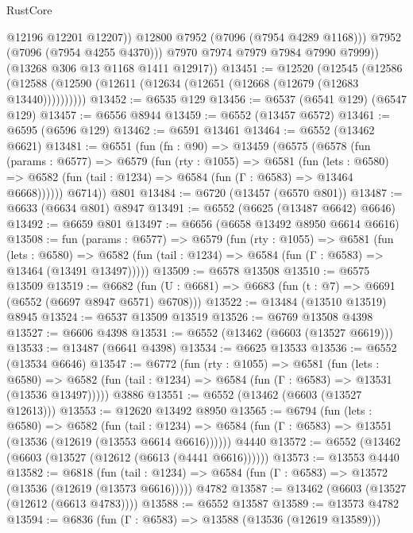 \begin{lexlean}{RustCore}
\begin{coremodule}
                  @12196
                  @12201
                  @12207))
              @12800
              @7952
              (@7096 (@7954 @4289 @1168)))
            @7952
            (@7096 (@7954 @4255 @4370)))
          @7970
          @7974
          @7979
          @7984
          @7990
          @7999))
      (@13268 @306 @13 @1168 @1411 @12917))
@13451 := @12520
    (@12545 (@12586 (@12588 (@12590 (@12611 (@12634 (@12651 (@12668 (@12679 (@12683 @13440))))))))))
@13452 := @6535 @129
@13456 := @6537 (@6541 @129) (@6547 @129)
@13457 := @6556 @8944
@13459 := @6552 (@13457 @6572)
@13461 := @6595 (@6596 @129)
@13462 := @6591 @13461
@13464 := @6552 (@13462 @6621)
@13481 := @6551
    (fun (fn : @90) =>
    @13459
      (@6575
        (@6578
          (fun (params : @6577) =>
          @6579
            (fun (rty : @1055) =>
            @6581
              (fun (lets : @6580) =>
              @6582 (fun (tail : @1234) => @6584 (fun (Γ : @6583) => @13464 @6668))))))
        @6714))
    @801
@13484 := @6720 (@13457 (@6570 @801))
@13487 := @6633 (@6634 @801) @8947
@13491 := @6552 (@6625 (@13487 @6642) @6646)
@13492 := @6659 @801
@13497 := @6656 (@6658 @13492 @8950 @6614 @6616)
@13508 := fun (params : @6577) =>
  @6579
    (fun (rty : @1055) =>
    @6581
      (fun (lets : @6580) =>
      @6582 (fun (tail : @1234) => @6584 (fun (Γ : @6583) => @13464 (@13491 @13497)))))
@13509 := @6578 @13508
@13510 := @6575 @13509
@13519 := @6682 (fun (U : @6681) => @6683 (fun (t : @7) => @6691 (@6552 (@6697 @8947 @6571) @6708)))
@13522 := @13484 (@13510 @13519) @8945
@13524 := @6537 @13509 @13519
@13526 := @6769 @13508 @4398
@13527 := @6606 @4398
@13531 := @6552 (@13462 (@6603 (@13527 @6619)))
@13533 := @13487 (@6641 @4398)
@13534 := @6625 @13533
@13536 := @6552 (@13534 @6646)
@13547 := @6772
    (fun (rty : @1055) =>
    @6581
      (fun (lets : @6580) =>
      @6582 (fun (tail : @1234) => @6584 (fun (Γ : @6583) => @13531 (@13536 @13497)))))
    @3886
@13551 := @6552 (@13462 (@6603 (@13527 @12613)))
@13553 := @12620 @13492 @8950
@13565 := @6794
    (fun (lets : @6580) =>
    @6582
      (fun (tail : @1234) =>
      @6584 (fun (Γ : @6583) => @13551 (@13536 (@12619 (@13553 @6614 @6616))))))
    @4440
@13572 := @6552 (@13462 (@6603 (@13527 (@12612 (@6613 (@4441 @6616))))))
@13573 := @13553 @4440
@13582 := @6818
    (fun (tail : @1234) => @6584 (fun (Γ : @6583) => @13572 (@13536 (@12619 (@13573 @6616)))))
    @4782
@13587 := @13462 (@6603 (@13527 (@12612 (@6613 @4783))))
@13588 := @6552 @13587
@13589 := @13573 @4782
@13594 := @6836 (fun (Γ : @6583) => @13588 (@13536 (@12619 @13589)))

\end{coremodule}
\end{lexlean}
